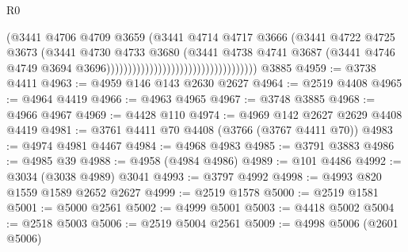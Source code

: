 \begin{lexlean}{R0}
\begin{coremodule}
                                                              (@3441
                                                                @4706
                                                                @4709
                                                                @3659
                                                                (@3441
                                                                  @4714
                                                                  @4717
                                                                  @3666
                                                                  (@3441
                                                                    @4722
                                                                    @4725
                                                                    @3673
                                                                    (@3441
                                                                      @4730
                                                                      @4733
                                                                      @3680
                                                                      (@3441
                                                                        @4738
                                                                        @4741
                                                                        @3687
                                                                        (@3441
                                                                          @4746
                                                                          @4749
                                                                          @3694
                                                                          @3696)))))))))))))))))))))))))))))))))))
    @3885
@4959 := @3738 @4411
@4963 := @4959 @146 @143 @2630 @2627
@4964 := @2519 @4408
@4965 := @4964 @4419
@4966 := @4963 @4965
@4967 := @3748 @3885
@4968 := @4966 @4967
@4969 := @4428 @110
@4974 := @4969 @142 @2627 @2629 @4408 @4419
@4981 := @3761 @4411 @70 @4408 (@3766 (@3767 @4411 @70))
@4983 := @4974 @4981 @4467
@4984 := @4968 @4983
@4985 := @3791 @3883
@4986 := @4985 @39
@4988 := @4958 (@4984 @4986)
@4989 := @101 @4486
@4992 := @3034 (@3038 @4989) @3041
@4993 := @3797 @4992
@4998 := @4993 @820 @1559 @1589 @2652 @2627
@4999 := @2519 @1578
@5000 := @2519 @1581
@5001 := @5000 @2561
@5002 := @4999 @5001
@5003 := @4418 @5002
@5004 := @2518 @5003
@5006 := @2519 @5004 @2561
@5009 := @4998 @5006 (@2601 @5006)

\end{coremodule}
\end{lexlean}
